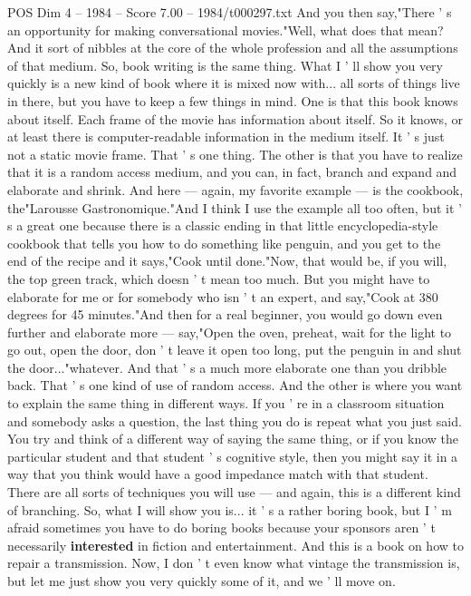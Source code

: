 \begin{textsample}{POS Dim 4 – 1984 – Score 7.00 – 1984/t000297.txt}
And you then say,"There ' s an opportunity for making conversational movies."Well, what does that mean?
And it sort of nibbles at the core of the whole profession and all the assumptions of that medium.
So, book writing is the same thing.
What I ' ll show you very quickly is a new kind of book where it is mixed now with... all sorts of things live in there, but you have to keep a few things in mind.
One is that this book knows about itself.
Each frame of the movie has information about itself.
So it knows, or at least there is computer-readable information in the medium itself.
It ' s just not a static movie frame.
That ' s one thing.
The other is that you have to realize that it is a random access medium, and you can, in fact, branch and expand and elaborate and shrink.
And here — again, my favorite example — is the cookbook, the"Larousse Gastronomique."And I think I use the example all too often, but it ' s a great one because there is a classic ending in that little encyclopedia-style cookbook that tells you how to do something like penguin, and you get to the end of the recipe and it says,"Cook until done."Now, that would be, if you will, the top green track, which doesn ' t mean too much.
But you might have to elaborate for me or for somebody who isn ' t an expert, and say,"Cook at 380 degrees for 45 minutes."And then for a real beginner, you would go down even further and elaborate more — say,"Open the oven, preheat, wait for the light to go out, open the door, don ' t leave it open too long, put the penguin in and shut the door..."whatever.
And that ' s a much more elaborate one than you dribble back.
That ' s one kind of use of random access.
And the other is where you want to explain the same thing in different ways.
If you ' re in a classroom situation and somebody asks a question, the last thing you do is repeat what you just said.
You try and think of a different way of saying the same thing, or if you know the particular student and that student ' s cognitive style, then you might say it in a way that you think would have a good impedance match with that student.
There are all sorts of techniques you will use — and again, this is a different kind of branching.
So, what I will show you is... it ' s a rather boring book, but I ' m afraid sometimes you have to do boring books because your sponsors aren ' t necessarily \textbf{interested} in fiction and entertainment.
And this is a book on how to repair a transmission.
Now, I don ' t even know what vintage the transmission is, but let me just show you very quickly some of it, and we ' ll move on.

\end{textsample}
